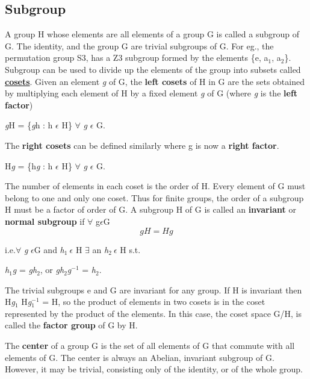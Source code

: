 \subsection{Subgroup}
A group H whose elements are all elements of a group G is called a subgroup of G. 
The identity, and the group G are trivial subgroups of G. For eg., the permutation group S3, has a Z3 subgroup formed by the elements \{e, a$_1$, a$_2$\}. 
Subgroup can be used to divide up the elements of the group into subsets called \href{https://en.wikipedia.org/wiki/Coset}{\textbf{cosets}}.
Given an element \textit{g} of G, the \textbf{left cosets} of H in G are the sets obtained by multiplying each element of H by a fixed element \textit{g} of G (where \textit{g} is the \textbf{left factor})
\begin{center}
    \textit{g}H = \{\textit{g}h : h $\epsilon$ H\} $\forall$ \textit{g} $\epsilon$ G.
\end{center}
The \textbf{right cosets} can be defined similarly where g is now a \textbf{right factor}.
\begin{center}
    H\textit{g} = \{h\textit{g} : h $\epsilon$ H\} $\forall$ \textit{g} $\epsilon$ G.
\end{center}

The number of elements in each coset is the order of H. Every element of G
must belong to one and only one coset. Thus for finite groups, the order of
a subgroup H must be a factor of order of G. 
A subgroup H of G is called an \textbf{invariant} or \textbf{normal subgroup} if $\forall$ g$\epsilon$G
\begin{equation}
    gH = Hg
\end{equation}

i.e.$\forall$ \textit{g} $\epsilon$G and \textit{h}$_1 \: \epsilon$ H $\exists$ an \textit{h}$_2 \: \epsilon$ H s.t.
\begin{center}
    \textit{h}$_1$\textit{g} = \textit{gh}$_2$, or \textit{gh}$_2$\textit{g}$^{-1}$ = \textit{h}$_2$.
\end{center} 

The trivial subgroups e and G are invariant for any group. If H is invariant then H\textit{g}$_1$ H\textit{g}$_1^{-1}$ = H, 
so the product of elements in two cosets is in the coset represented by the product of the elements. 
In this case, the coset space G/H, is called the \textbf{factor group} of G by H.

The \textbf{center} of a group G is the set of all elements of G that commute
with all elements of G. The center is always an Abelian, invariant subgroup
of G. However, it may be trivial, consisting only of the identity, or of the
whole group.

